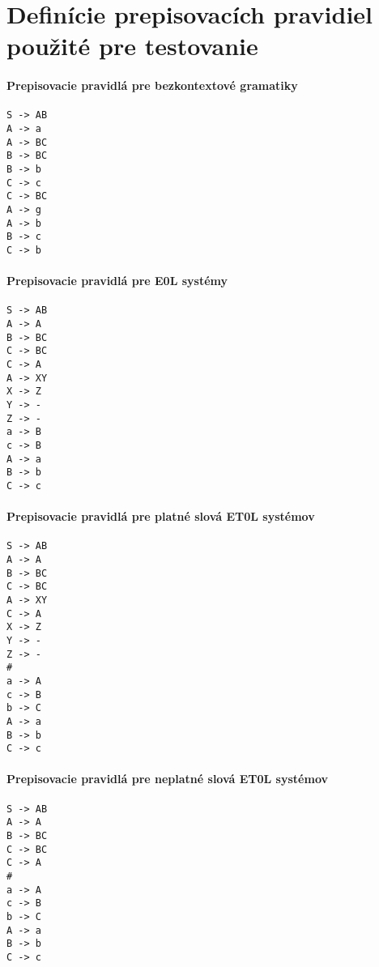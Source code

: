 
\chapter{Definície prepisovacích pravidiel použité pre testovanie}
\subsubsection*{Prepisovacie pravidlá pre bezkontextové gramatiky}

\begin{verbatim}
S -> AB
A -> a
A -> BC
B -> BC
B -> b
C -> c
C -> BC
A -> g
A -> b
B -> c
C -> b
\end{verbatim}

\subsubsection*{Prepisovacie pravidlá pre E0L systémy}
\begin{verbatim}
S -> AB
A -> A
B -> BC
C -> BC
C -> A
A -> XY
X -> Z
Y -> -
Z -> -
a -> B
c -> B
A -> a
B -> b
C -> c
\end{verbatim}

\subsubsection*{Prepisovacie pravidlá pre platné slová ET0L systémov}
\begin{verbatim}
S -> AB
A -> A
B -> BC
C -> BC
A -> XY
C -> A
X -> Z
Y -> -
Z -> -
#
a -> A
c -> B
b -> C
A -> a
B -> b
C -> c
\end{verbatim}

\subsubsection*{Prepisovacie pravidlá pre neplatné slová ET0L systémov}

\begin{verbatim}
S -> AB
A -> A
B -> BC
C -> BC
C -> A
#
a -> A
c -> B
b -> C
A -> a
B -> b
C -> c
\end{verbatim}